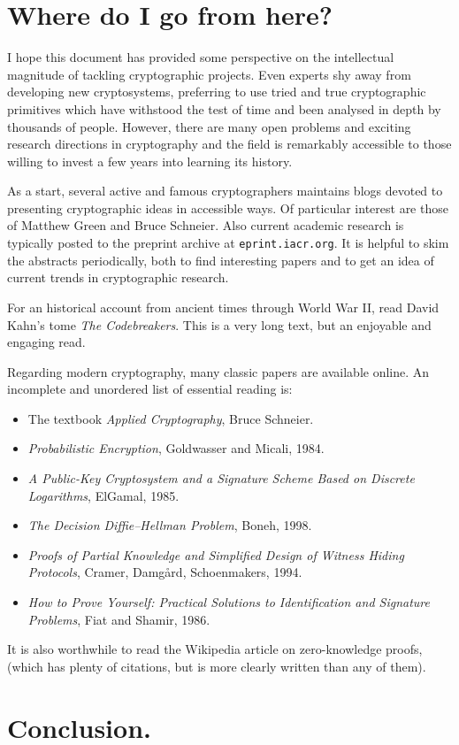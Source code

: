 \documentclass[letterpaper]{article}
\begin{document}
\section{Where do I go from here?}

I hope this document has provided some perspective on the intellectual
magnitude of tackling cryptographic projects. Even experts shy away from
developing new cryptosystems, preferring to use tried and true cryptographic
primitives which have withstood the test of time and been analysed in depth
by thousands of people. However, there are many open problems and exciting
research directions in cryptography and the field is remarkably accessible
to those willing to invest a few years into learning its history.

As a start, several active and famous cryptographers maintains blogs devoted
to presenting cryptographic ideas in accessible ways. Of particular interest
are those of Matthew Green and Bruce Schneier. Also current academic research
is typically posted to the preprint archive at \texttt{eprint.iacr.org}. It
is helpful to skim the abstracts periodically, both to find interesting papers
and to get an idea of current trends in cryptographic research.

For an historical account from ancient times through World War II, read
David Kahn's tome \emph{The Codebreakers}. This is a very long text, but an
enjoyable and engaging read.

Regarding modern cryptography, many classic papers are available online. An
incomplete and unordered list of essential reading is:
\begin{itemize}
\item The textbook \emph{Applied Cryptography}, Bruce Schneier.
\item \emph{Probabilistic Encryption}, Goldwasser and Micali, 1984.
\item \emph{A Public-Key Cryptosystem and a Signature Scheme Based on Discrete Logarithms}, ElGamal, 1985.
\item \emph{The Decision Diffie–Hellman Problem}, Boneh, 1998.
\item \emph{Proofs of Partial Knowledge and Simplified Design of Witness Hiding Protocols}, Cramer, Damg{\aa}rd, Schoenmakers, 1994.
\item \emph{How to Prove Yourself: Practical Solutions to Identification and Signature Problems}, Fiat and Shamir, 1986.
\end{itemize}
It is also worthwhile to read the Wikipedia article on zero-knowledge proofs,
(which has plenty of citations, but is more clearly written than any of them).

\section{Conclusion.}



\end{document}
